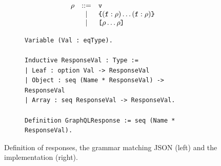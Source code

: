 \begin{figure}[h]
\centering
\begin{subfigure}{.5\textwidth}

  \begin{displaymath}
	\begin{array}{rcl}
	\rho & ::= & \texttt{v}\\
	& | & \texttt{\{} (\texttt{f} : \rho) \ldots (\texttt{f} : \rho) \texttt{\}} \\
	& | & \texttt{[} \rho \ldots \rho \texttt{]}
	\end{array}
	\end{displaymath}
	
	

 
  \end{subfigure}%
  \begin{subfigure}{.5\textwidth}
\begin{verbatim}
Variable (Val : eqType).
  
Inductive ResponseVal : Type :=
| Leaf : option Val -> ResponseVal
| Object : seq (Name * ResponseVal) -> ResponseVal
| Array : seq ResponseVal -> ResponseVal.
  
Definition GraphQLResponse := seq (Name * ResponseVal).
\end{verbatim}
   
  \end{subfigure}
  \caption{Definition of \gql responses, the grammar matching JSON (left) and the \coq implementation (right).
  }
  \label{fig:response_def}

\end{figure}
%

